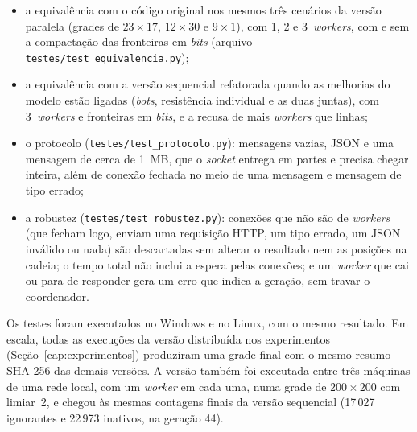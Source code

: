 \begin{itemize}
    \item a equivalência com o código original nos mesmos três cenários da versão paralela (grades de $23 \times 17$, $12 \times 30$ e $9 \times 1$), com 1, 2 e 3~\textit{workers}, com e sem a compactação das fronteiras em \textit{bits} (arquivo \texttt{testes/test\_equivalencia.py});
    \item a equivalência com a versão sequencial refatorada quando as melhorias do modelo estão ligadas (\textit{bots}, resistência individual e as duas juntas), com 3~\textit{workers} e fronteiras em \textit{bits}, e a recusa de mais \textit{workers} que linhas;
    \item o protocolo (\texttt{testes/test\_protocolo.py}): mensagens vazias, JSON e uma mensagem de cerca de 1~MB, que o \textit{socket} entrega em partes e precisa chegar inteira, além de conexão fechada no meio de uma mensagem e mensagem de tipo errado;
    \item a robustez (\texttt{testes/test\_robustez.py}): conexões que não são de \textit{workers} (que fecham logo, enviam uma requisição HTTP, um tipo errado, um JSON inválido ou nada) são descartadas sem alterar o resultado nem as posições na cadeia; o tempo total não inclui a espera pelas conexões; e um \textit{worker} que cai ou para de responder gera um erro que indica a geração, sem travar o coordenador.
\end{itemize}

Os testes foram executados no Windows e no Linux, com o mesmo resultado. Em escala, todas as execuções da versão distribuída nos experimentos (Seção~\ref{cap:experimentos}) produziram uma grade final com o mesmo resumo SHA-256 das demais versões. A versão também foi executada entre três máquinas de uma rede local, com um \textit{worker} em cada uma, numa grade de $200 \times 200$ com limiar~2, e chegou às mesmas contagens finais da versão sequencial (17\,027 ignorantes e 22\,973 inativos, na geração 44). 
